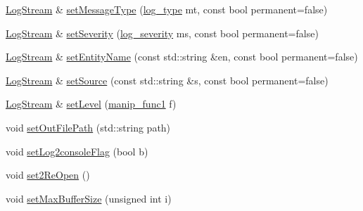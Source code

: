 \begin{DoxyCompactItemize}
\item 
\hyperlink{classkisscpp_1_1_log_stream}{Log\-Stream} \& \hyperlink{classkisscpp_1_1_log_stream_accdbdc4d7876d4b1160321d0e49a4a24}{set\-Message\-Type} (\hyperlink{namespacekisscpp_a18db16d1f4c281bec16e637c56b0cc88}{log\-\_\-type} mt, const bool permanent=false)
\item 
\hyperlink{classkisscpp_1_1_log_stream}{Log\-Stream} \& \hyperlink{classkisscpp_1_1_log_stream_acc6d5cdabae2f2febd89518dee4ef14a}{set\-Severity} (\hyperlink{namespacekisscpp_a2479a56cdedf21357ca5c68adc699d00}{log\-\_\-severity} ms, const bool permanent=false)
\item 
\hyperlink{classkisscpp_1_1_log_stream}{Log\-Stream} \& \hyperlink{classkisscpp_1_1_log_stream_a2eb0e6909fbdce8648f349dde4b3330c}{set\-Entity\-Name} (const std\-::string \&en, const bool permanent=false)
\item 
\hyperlink{classkisscpp_1_1_log_stream}{Log\-Stream} \& \hyperlink{classkisscpp_1_1_log_stream_a2c96be0773180e5f0f9ba9b54a0374ae}{set\-Source} (const std\-::string \&s, const bool permanent=false)
\item 
\hyperlink{classkisscpp_1_1_log_stream}{Log\-Stream} \& \hyperlink{classkisscpp_1_1_log_stream_afbccf2eeb34441a14113b29b89c15f88}{set\-Level} (\hyperlink{classkisscpp_1_1_log_stream_ab6994c757d4c63c4388a932cf2be2c9d}{manip\-\_\-func1} f)
\item 
void \hyperlink{classkisscpp_1_1_log_stream_afb35292a073160d5fc74b1e94512226e}{set\-Out\-File\-Path} (std\-::string path)
\item 
void \hyperlink{classkisscpp_1_1_log_stream_ab9813d6efb18c2533dd0489306af5f3d}{set\-Log2console\-Flag} (bool b)
\item 
void \hyperlink{classkisscpp_1_1_log_stream_a739a620e8f2e957e79cfbdd3e7f58500}{set2\-Re\-Open} ()
\item 
void \hyperlink{classkisscpp_1_1_log_stream_a97cbac369b8096467f286fcc9d92a13a}{set\-Max\-Buffer\-Size} (unsigned int i)
\end{DoxyCompactItemize}


